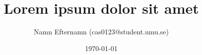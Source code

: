\title{Lorem ipsum dolor sit amet}
\author{Namn Efternamn (cas0123@student.umu.se)}
\date{\today}

\begin{titlepage}
  \maketitle
  \thispagestyle{fancy}
  \rhead{\today}
\end{titlepage}
